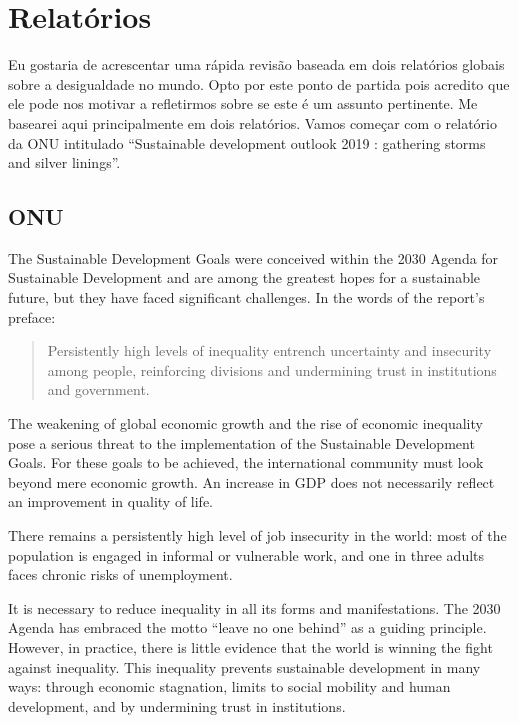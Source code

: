 \section{Relatórios}

Eu gostaria de acrescentar uma rápida revisão baseada em dois relatórios globais sobre a desigualdade no mundo. Opto por este ponto de partida pois acredito que ele pode nos motivar a refletirmos sobre se este é um assunto pertinente. Me basearei aqui principalmente em dois relatórios. Vamos começar com o relatório da ONU intitulado ``Sustainable development outlook 2019 : gathering storms and silver linings''\cite{ONU}.  

\subsection{ONU} 


The Sustainable Development Goals were conceived within the 2030 Agenda for Sustainable Development and are among the greatest hopes for a sustainable future, but they have faced significant challenges. In the words of the report’s preface:

\begin{quote}
Persistently high levels of inequality entrench uncertainty and insecurity among people, reinforcing divisions and undermining trust in institutions and government.
\end{quote}

The weakening of global economic growth and the rise of economic inequality pose a serious threat to the implementation of the Sustainable Development Goals. For these goals to be achieved, the international community must look beyond mere economic growth. An increase in GDP does not necessarily reflect an improvement in quality of life.

There remains a persistently high level of job insecurity in the world: most of the population is engaged in informal or vulnerable work, and one in three adults faces chronic risks of unemployment.

It is necessary to reduce inequality in all its forms and manifestations. The 2030 Agenda has embraced the motto “leave no one behind” as a guiding principle. However, in practice, there is little evidence that the world is winning the fight against inequality. This inequality prevents sustainable development in many ways: through economic stagnation, limits to social mobility and human development, and by undermining trust in institutions.

